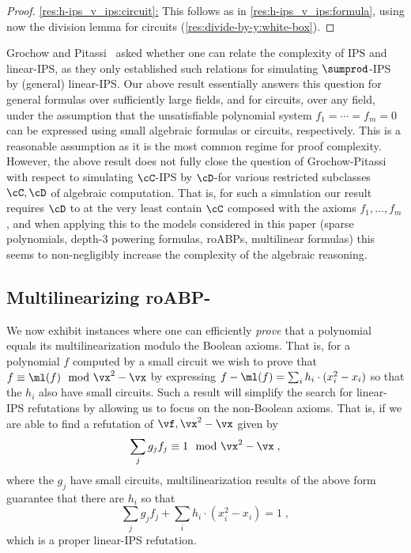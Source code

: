 \documentclass[11pt]{article}
\numberwithin{equation}{section}
\theoremstyle{definition}
\theoremstyle{plain}
\begin{document}
\begin{proof}
        \uline{\eqref{res:h-ips_v_ips:circuit}:} This follows as in \eqref{res:h-ips_v_ips:formula}, using now the division lemma for circuits (\autoref{res:divide-by-y:white-box}).
\end{proof}

Grochow and Pitassi~\cite[Open Question 1.13\footnote{This refers to the following version: \url{http://arxiv.org/abs/1404.3820v1}\!\!\!.}]{DBLP:journals/jacm/GrochowP18} asked whether one can relate the complexity of IPS and linear-IPS, as they only established such relations for simulating $\sumprod$-IPS by (general) linear-IPS\@.  Our above result essentially answers this question for general formulas over sufficiently large fields, and for circuits, over any field, under the assumption that the unsatisfiable polynomial system $f_1=\cdots=f_m=0$ can be expressed using small algebraic formulas or circuits, respectively.  This is a reasonable assumption as it is the most common regime for proof complexity.  However, the above result does not fully close the question of Grochow-Pitassi~\cite{DBLP:journals/jacm/GrochowP18} with respect to simulating $\cC$-IPS by $\cD$-\lIPS for various restricted subclasses $\cC,\cD$ of algebraic computation.  That is, for such a simulation our result requires $\cD$ to at the very least contain $\cC$ composed with the axioms $f_1,\ldots,f_m$, and  when applying this to the models considered in this paper (sparse polynomials, depth-3 powering formulas, roABPs, multilinear formulas) this seems to non-negligibly increase the complexity of the algebraic reasoning.

\subsection{Multilinearizing roABP-\lIPS}\label{sec:multilinearization:roABP}

We now exhibit instances where one can efficiently \emph{prove} that a polynomial equals its multilinearization modulo the Boolean axioms. That is, for a polynomial $f$ computed by a small circuit we wish to prove that $f\equiv \ml(f)\mod \vx^2-\vx$ by expressing $f-\ml(f)=\sum_i h_i \cdot (x_i^2-x_i)$ so that the $h_i$ also have small circuits.  Such a result will simplify the search for linear-IPS refutations by allowing us to focus on the non-Boolean axioms.  That is, if we are able to find a refutation of $\vf,\vx^2-\vx$ given by
\[
        \sum_j g_j f_j \equiv 1 \mod \vx^2-\vx
        \;,
\]
where the $g_j$ have small circuits, multilinearization results of the above form guarantee that there are $h_i$ so that
\[
        \sum_j g_j f_j +\sum_i h_i\cdot (x_i^2-x_i)=1
        \;,
\]
which is a proper linear-IPS refutation.
\end{document}
